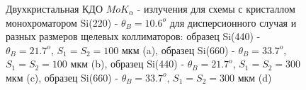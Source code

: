 \begin{figure}[H]
  \centering
  \hfill
  \hfill
  \hfill
  \caption{Двухкристальная КДО $MoK_{\alpha}$ - излучения для схемы с кристаллом монохроматором Si(220) - $\theta_B = 10.6^o$
  для дисперсионного случая и разных размеров щелевых коллиматоров:
  образец Si(440) - $\theta_B = 21.7^o$, $S_1 = S_2 = 100$ мкм (a),
   образец Si(660) - $\theta_B = 33.7^o$, $S_1 = S_2 = 100$ мкм (b),
    образец Si(440) - $\theta_B = 21.7^o$, $S_1 = S_2 = 300$ мкм (c),
     образец Si(660) - $\theta_B = 33.7^o$, $S_1 = S_2 = 300$ мкм (d)}
  \label{ris:disspersion_curves_expantheory}
\end{figure}

